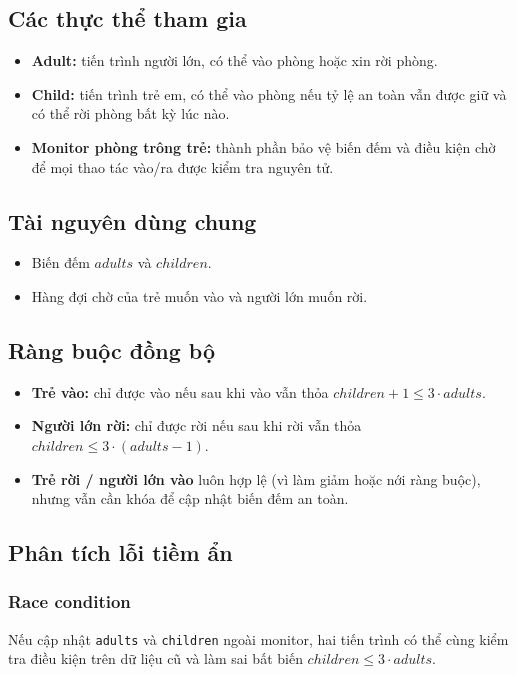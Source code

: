 \subsection{Các thực thể tham gia}
\begin{itemize}
    \item \textbf{Adult:} tiến trình người lớn, có thể vào phòng hoặc xin rời phòng.
    \item \textbf{Child:} tiến trình trẻ em, có thể vào phòng nếu tỷ lệ an toàn vẫn được giữ và có thể rời phòng bất kỳ lúc nào.
    \item \textbf{Monitor phòng trông trẻ:} thành phần bảo vệ biến đếm và điều kiện chờ để mọi thao tác vào/ra được kiểm tra nguyên tử.
\end{itemize}

\subsection{Tài nguyên dùng chung}
\begin{itemize}
    \item Biến đếm $adults$ và $children$.
    \item Hàng đợi chờ của trẻ muốn vào và người lớn muốn rời.
\end{itemize}

\subsection{Ràng buộc đồng bộ}
\begin{itemize}
    \item \textbf{Trẻ vào:} chỉ được vào nếu sau khi vào vẫn thỏa $children + 1 \le 3 \cdot adults$.
    \item \textbf{Người lớn rời:} chỉ được rời nếu sau khi rời vẫn thỏa $children \le 3 \cdot (adults - 1)$.
    \item \textbf{Trẻ rời / người lớn vào} luôn hợp lệ (vì làm giảm hoặc nới ràng buộc), nhưng vẫn cần khóa để cập nhật biến đếm an toàn.
\end{itemize}

\subsection{Phân tích lỗi tiềm ẩn}

\subsubsection*{Race condition}
Nếu cập nhật \texttt{adults} và \texttt{children} ngoài monitor, hai tiến trình
có thể cùng kiểm tra điều kiện trên dữ liệu cũ và làm sai bất biến
$children \le 3 \cdot adults$.

